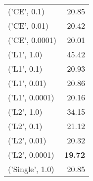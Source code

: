 \begin{tabular}{lr}
 ('CE', 0.1)     &          20.85 \\
 ('CE', 0.01)    &          20.42 \\
 ('CE', 0.0001)  &          20.01 \\
 ('L1', 1.0)     &          45.42 \\
 ('L1', 0.1)     &          20.93 \\
 ('L1', 0.01)    &          20.86 \\
 ('L1', 0.0001)  &          20.16 \\
 ('L2', 1.0)     &          34.15 \\
 ('L2', 0.1)     &          21.12 \\
 ('L2', 0.01)    &          20.32 \\
 ('L2', 0.0001)  &          {\bf 19.72} \\
 ('Single', 1.0) &          20.85 \\
\hline
\end{tabular}
